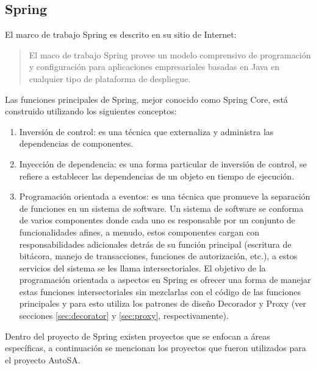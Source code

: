 \subsection{Spring}\label{sec:spring}
El marco de trabajo Spring es descrito en su sitio de Internet\cite{SpringFramework}:
\begin{quote}
	El maco de trabajo Spring provee un modelo comprensivo de programación y configuración para aplicaciones empresariales basadas en Java en cualquier tipo de plataforma de despliegue.
\end{quote}

Las funciones principales de Spring, mejor conocido como Spring Core, está construido utilizando los siguientes conceptos\cite{Spring5DesignPatterns, ProSpring5, WellGroundedJavaDeveloper, SpringInAction}:
\begin{enumerate}
	\item Inversión de control: es una técnica que externaliza y administra las dependencias de componentes.

	\item Inyección de dependencia: es una forma particular de inversión de control, se refiere a establecer las dependencias de un objeto en tiempo de ejecución.

	\item Programación orientada a eventos: es una técnica que promueve la separación de funciones en un sistema de software. Un sistema de software se conforma de varios componentes donde cada uno es responsable por un conjunto de funcionalidades afines, a menudo, estos componentes cargan con responsabilidades adicionales detrás de su función principal (escritura de bitácora, manejo de transacciones, funciones de autorización, etc.), a estos servicios del sistema se les llama intersectoriales. El objetivo de la programación orientada a aspectos en Spring  es ofrecer una forma de manejar estas funciones intersectoriales sin mezclarlas con el código de las funciones principales y para esto utiliza los patrones de diseño Decorador y Proxy (ver secciones \ref{sec:decorator} y \ref{sec:proxy}, respectivamente).
\end{enumerate}

Dentro del proyecto de Spring existen proyectos que se enfocan a áreas específicas, a continuación se mencionan los proyectos que fueron utilizados para el proyecto AutoSA.

